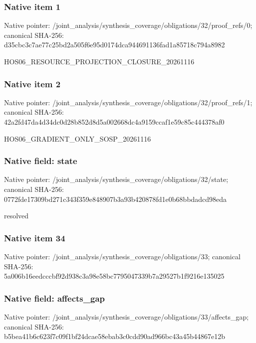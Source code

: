 \documentclass[10pt,a4paper]{article}
\begin{document}
\subsubsection{Native item 1}
Native pointer: /joint\_\allowbreak{}analysis/synthesis\_\allowbreak{}coverage/obligations/32/proof\_\allowbreak{}refs/0; canonical SHA-256: d35cbc3c7ae77c25bd2a505f6e95d0174dca944691136fad1a85718c794a8982

\begingroup\raggedright\sloppy HOS06\_\allowbreak{}RESOURCE\_\allowbreak{}PROJECTION\_\allowbreak{}CLOSURE\_\allowbreak{}20261116\par\endgroup

\subsubsection{Native item 2}
Native pointer: /joint\_\allowbreak{}analysis/synthesis\_\allowbreak{}coverage/obligations/32/proof\_\allowbreak{}refs/1; canonical SHA-256: 42a2fd47da4d34dc0d28b852d8d5a002668dc4a9159ccaf1e59c85c444378af0

\begingroup\raggedright\sloppy HOS06\_\allowbreak{}GRADIENT\_\allowbreak{}ONLY\_\allowbreak{}SOSP\_\allowbreak{}20261116\par\endgroup

\subsubsection{Native field: state}
Native pointer: /joint\_\allowbreak{}analysis/synthesis\_\allowbreak{}coverage/obligations/32/state; canonical SHA-256: 0772fde17309bd271c343f359e848907b3a93b420878fd1e0b68bbdadcd98eda

\begingroup\raggedright\sloppy resolved\par\endgroup

\subsubsection{Native item 34}
Native pointer: /joint\_\allowbreak{}analysis/synthesis\_\allowbreak{}coverage/obligations/33; canonical SHA-256: 5a006b16eedcccbf92d938c3a98e58bc7795047339b7a29527b1f9216e135025

\subsubsection{Native field: affects\_\allowbreak{}gap}
Native pointer: /joint\_\allowbreak{}analysis/synthesis\_\allowbreak{}coverage/obligations/33/affects\_\allowbreak{}gap; canonical SHA-256: b5bea41b6c623f7c09f1bf24dcae58ebab3c0cdd90ad966bc43a45b44867e12b
\end{document}
